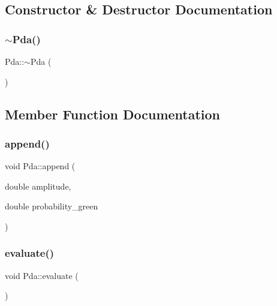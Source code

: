 \subsection{Constructor \& Destructor Documentation}
\mbox{\label{class_pda_a9c72f6be70a8718284328f735b79374c}} 
\subsubsection{\texorpdfstring{$\sim$\+Pda()}{~Pda()}}
{\footnotesize\ttfamily Pda\+::$\sim$\+Pda (\begin{DoxyParamCaption}{ }\end{DoxyParamCaption})\hspace{0.3cm}{\ttfamily [inline]}}



\subsection{Member Function Documentation}
\mbox{\label{class_pda_a4b71f2d58129c8db45c6779b0c1734d1}} 
\subsubsection{\texorpdfstring{append()}{append()}}
{\footnotesize\ttfamily void Pda\+::append (\begin{DoxyParamCaption}\item[{double}]{amplitude,  }\item[{double}]{probability\+\_\+green }\end{DoxyParamCaption})}

\mbox{\label{class_pda_a754b1fe7d049bab1ee039471b3e461a9}} 
\subsubsection{\texorpdfstring{evaluate()}{evaluate()}}
{\footnotesize\ttfamily void Pda\+::evaluate (\begin{DoxyParamCaption}{ }\end{DoxyParamCaption})}

\mbox{\label{class_pda_a769d8bdf3a739d421e226e126aae2d42}} 
